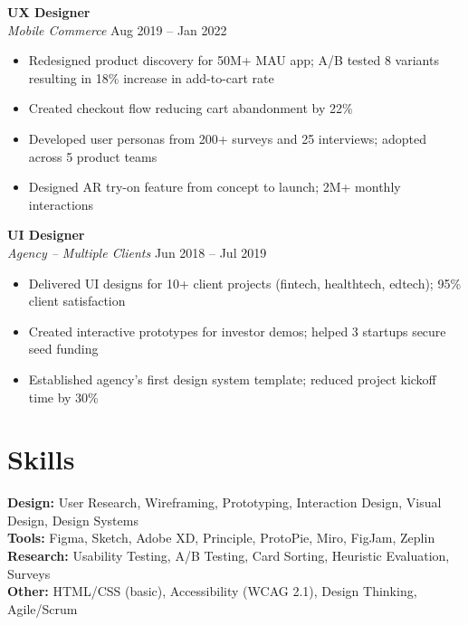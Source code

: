 \documentclass[10.5pt,a4paper]{article}
\begin{document}
\vspace{6pt}

\textbf{UX Designer} \\[2pt]
\textit{Mobile Commerce} \hfill Aug 2019 -- Jan 2022
\begin{itemize}
  \item Redesigned product discovery for 50M+ MAU app; A/B tested 8 variants resulting in 18\% increase in add-to-cart rate
  \item Created checkout flow reducing cart abandonment by 22\%
  \item Developed user personas from 200+ surveys and 25 interviews; adopted across 5 product teams
  \item Designed AR try-on feature from concept to launch; 2M+ monthly interactions
\end{itemize}

\vspace{6pt}

\textbf{UI Designer} \\[2pt]
\textit{Agency -- Multiple Clients} \hfill Jun 2018 -- Jul 2019
\begin{itemize}
  \item Delivered UI designs for 10+ client projects (fintech, healthtech, edtech); 95\% client satisfaction
  \item Created interactive prototypes for investor demos; helped 3 startups secure seed funding
  \item Established agency's first design system template; reduced project kickoff time by 30\%
\end{itemize}

\vspace{4pt}

\section{Skills}
\textbf{Design:} User Research, Wireframing, Prototyping, Interaction Design, Visual Design, Design Systems\\[3pt]
\textbf{Tools:} Figma, Sketch, Adobe XD, Principle, ProtoPie, Miro, FigJam, Zeplin\\[3pt]
\textbf{Research:} Usability Testing, A/B Testing, Card Sorting, Heuristic Evaluation, Surveys\\[3pt]
\textbf{Other:} HTML/CSS (basic), Accessibility (WCAG 2.1), Design Thinking, Agile/Scrum
\end{document}
